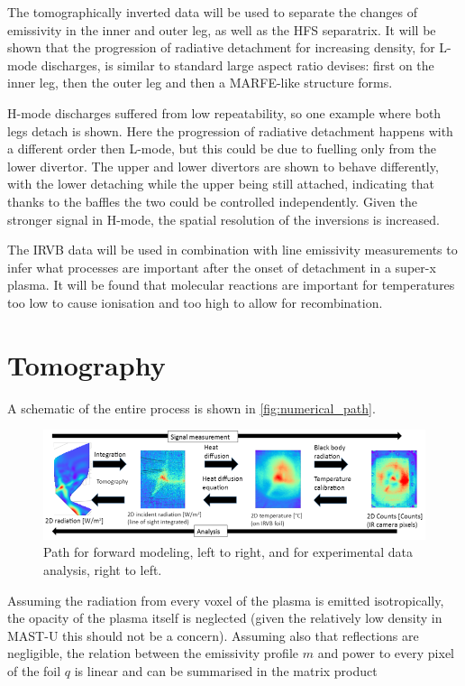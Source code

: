 The tomographically inverted data will be used to separate the changes of emissivity in the inner and outer leg, as well as the HFS separatrix. It will be shown that the progression of radiative detachment for increasing density, for L-mode discharges, is similar to standard large aspect ratio devises: first on the inner leg, then the outer leg and then a MARFE-like structure forms.

H-mode discharges suffered from low repeatability, so one example where both legs detach is shown. Here the progression of radiative detachment happens with a different order then L-mode, but this could be due to fuelling only from the lower divertor. The upper and lower divertors are shown to behave differently, with the lower detaching while the upper being still attached, indicating that thanks to the baffles the two could be controlled independently. Given the stronger signal in H-mode, the spatial resolution of the inversions is increased.

The IRVB data will be used in combination with line emissivity measurements to infer what processes are important after the onset of detachment in a super-x plasma. It will be found that molecular reactions are important for temperatures too low to cause ionisation and too high to allow for recombination.

\section{Tomography}\label{Tomography}
A schematic of the entire process is shown in \autoref{fig:numerical_path}.

\begin{figure}[!ht]
	\centering
	\includegraphics[width=\linewidth]{Chapters/chapter2/figs/numerical_path.png}
	\caption{Path for forward modeling, left to right, and for experimental data analysis, right to left.}
	\label{fig:numerical_path}
\end{figure}

Assuming the radiation from every voxel of the plasma is emitted isotropically, the opacity of the plasma itself is neglected (given the relatively low density in MAST-U this should not be a concern\cite{Verhaegh2021a,Terry1998,Soukhanovskii2022}).  Assuming also that reflections are negligible, the relation between the emissivity profile $m$ and power to every pixel of the foil $q$ is linear and can be summarised in the matrix product

